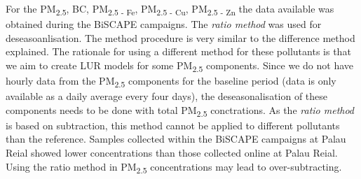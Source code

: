 \documentclass{article}
\begin{document}
For the PM\textsubscript{2.5}, BC, PM\textsubscript{2.5 - Fe}, PM\textsubscript{2.5 - Cu}, PM\textsubscript{2.5 - Zn} the data available was obtained during the BiSCAPE campaigns. The \textit{ratio method} was used for deseasoanlisation. The method procedure is very similar to the difference method explained. The rationale for using a different method for these pollutants is that we aim to create LUR models for some PM\textsubscript{2.5} components. Since we do not have hourly data from the PM\textsubscript{2.5} components for the baseline period (data is only available as a daily average every four days), the deseasonalisation of these components needs to be done with total PM\textsubscript{2.5} conctrations. As the \textit{ratio method} is based on subtraction, this method cannot be applied to different pollutants than the reference. Samples collected within the BiSCAPE campaigns at Palau Reial showed lower concentrations than those collected online at Palau Reial. Using the ratio method in PM\textsubscript{2.5} concentrations may lead to over-subtracting.
\end{document}
